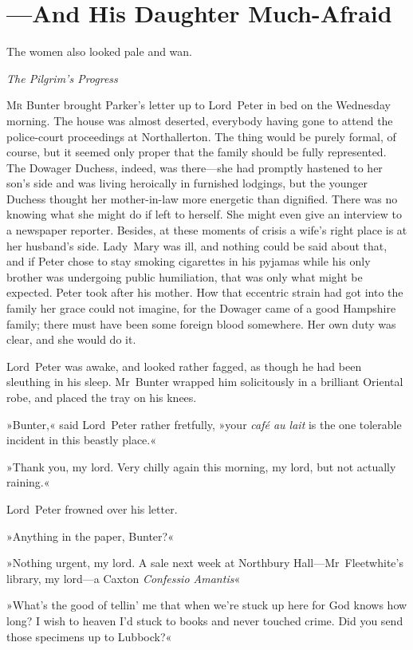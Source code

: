 
\chapter{—And His Daughter Much-Afraid}

\epigraph{The women also looked pale and wan.}{\textit{The Pilgrim's Progress}}


\lettrine[lines=4]{M}{r} Bunter brought Parker's letter up to Lord~Peter in bed on the Wednesday morning. The house was almost deserted, everybody having gone to attend the police-court proceedings at Northallerton. The thing would be purely formal, of course, but it seemed only proper that the family should be fully represented. The Dowager Duchess, indeed, was there—she had promptly hastened to her son's side and was living heroically in furnished lodgings, but the younger Duchess thought her mother-in-law more energetic than dignified. There was no knowing what she might do if left to herself. She might even give an interview to a newspaper reporter. Besides, at these moments of crisis a wife's right place is at her husband's side. Lady~Mary was ill, and nothing could be said about that, and if Peter chose to stay smoking cigarettes in his pyjamas while his only brother was undergoing public humiliation, that was only what might be expected. Peter took after his mother. How that eccentric strain had got into the family her grace could not imagine, for the Dowager came of a good Hampshire family; there must have been some foreign blood somewhere. Her own duty was clear, and she would do it.

Lord~Peter was awake, and looked rather fagged, as though he had been sleuthing in his sleep. Mr~Bunter wrapped him solicitously in a brilliant Oriental robe, and placed the tray on his knees.

»Bunter,« said Lord~Peter rather fretfully, »your \textit{café au lait} is the one tolerable incident in this beastly place.«

»Thank you, my lord. Very chilly again this morning, my lord, but not actually raining.«

Lord~Peter frowned over his letter.

»Anything in the paper, Bunter?«

»Nothing urgent, my lord. A sale next week at Northbury Hall—Mr~Fleetwhite's library, my lord—a Caxton \textit{Confessio Amantis}\longdash«

»What's the good of tellin' me that when we're stuck up here for God knows how long? I wish to heaven I'd stuck to books and never touched crime. Did you send those specimens up to Lubbock?«

